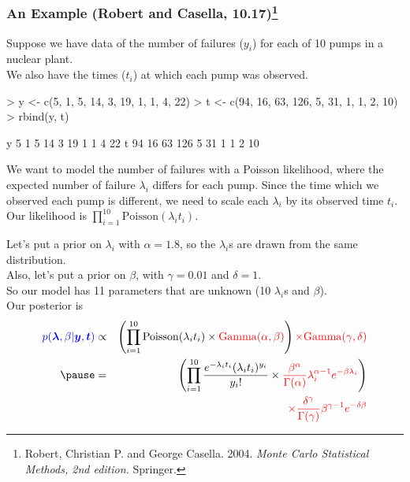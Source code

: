 \documentclass{beamer}
\begin{document}
\begin{frame}[fragile]
\frametitle{An Example (Robert and Casella, 10.17)\footnote{\tiny
{Robert, Christian P. and George Casella.  2004.  \textit{Monte Carlo
Statistical Methods, 2nd edition.}  Springer.}}}
\pause
\normalsize
Suppose we have data of the number of failures ($y_i$) for each of 10 pumps in
a nuclear plant. \\
\pause
\bigskip 
We also have the times ($t_i$) at which each pump was observed.
\medskip
\pause
\tiny
\begin{Schunk}
\begin{Sinput}
> y <- c(5, 1, 5, 14, 3, 19, 1, 1, 4, 22)
> t <- c(94, 16, 63, 126, 5, 31, 1, 1, 2, 10)
> rbind(y, t)
\end{Sinput}
\begin{Soutput}
  [,1] [,2] [,3] [,4] [,5] [,6] [,7] [,8] [,9] [,10]
y    5    1    5   14    3   19    1    1    4    22
t   94   16   63  126    5   31    1    1    2    10
\end{Soutput}
\end{Schunk}
\normalsize
\medskip
\pause
We want to model the number of failures with a Poisson likelihood,
where the expected number of failure $\lambda_i$ differs for each
pump.  \pause  Since the time which we observed each pump is
different, we need to scale each $\lambda_i$ by its observed time $t_i$.\\
\pause
\bigskip
Our likelihood is $\prod_{i=1}^{10} \mathrm{Poisson}(\lambda_i t_i)$.
\end{frame}

\begin{frame}
Let's put a  prior on $\lambda_i$ with
$\alpha = 1.8$, so the $\lambda_i$s are drawn from the same distribution.  \\
\pause
\bigskip
Also, let's put a  prior on $\beta$, with
$\gamma = 0.01$ and $\delta = 1$.\\
\pause
\bigskip 
So our model has 11 parameters that are unknown (10 $\lambda_i$s and $\beta$).\\
\pause
\bigskip
Our posterior is 
\begin{eqnarray*}
\blue{p(\bm{\lambda}, \beta | \bm{y}, \bm{t})} &\propto& \left( \prod_{i=1}^{10} \mathrm{Poisson}(\lambda_i
t_i) \times  \red{\mathrm{Gamma}(\alpha, \beta)} \right) \red{\times
\mathrm{Gamma}(\gamma, \delta)} \\
\pause
&=& \left( \prod_{i=1}^{10} \frac{e^{-\lambda_i t_i} (\lambda_i
t_i)^{y_i}}{y_i !} \times \red{\frac{\beta^{\alpha}}{\Gamma (\alpha)}
\lambda_i^{\alpha-1} e^{-\beta \lambda_i}} \right) \\
&\phantom{=}& \red{\times \frac{\delta^{\gamma}}{\Gamma (\gamma)}
\beta^{\gamma-1} e^{-\delta \beta} }
\end{eqnarray*}
\end{frame}
\end{document}
